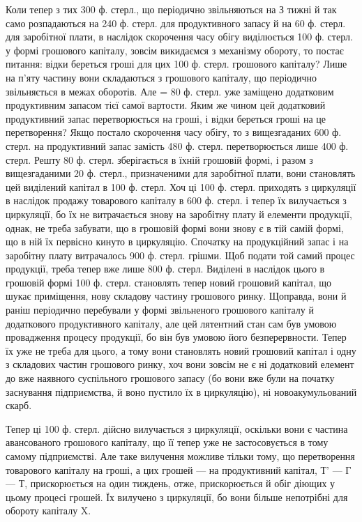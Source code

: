 Коли тепер з тих 300 ф. стерл., що періодично звільняються на З
тижні й так само розпадаються на 240 ф. стерл. для продуктивного запасу
й на 60 ф. стерл. для заробітної плати, в наслідок скорочення часу
обігу виділюється 100 ф. стерл. у формі грошового капіталу, зовсім викидаємся
з механізму обороту, то постає питання: відки береться гроші
для цих 100 ф. стерл. грошового капіталу? Лише на п’яту частину вони
складаються з грошового капіталу, що періодично звільняється в межах
оборотів. Але  = 80 ф. стерл. уже заміщено додатковим продуктивним
запасом тієї самої вартости. Яким же чином цей додатковий продуктивний
запас перетворюється на гроші, і відки береться гроші на це перетворення?
Якщо постало скорочення часу обігу, то з вищезгаданих 600 ф. стерл.
на продуктивний запас замість 480 ф. стерл. перетворюється лише 400 ф.
стерл. Решту 80 ф. стерл. зберігається в їхній грошовій формі, і
разом з вищезгаданими 20 ф. стерл., призначеними для заробітної плати,
вони становлять цей виділений капітал в 100 ф. стерл. Хоч ці 100 ф.
стерл. приходять з циркуляції в наслідок продажу товарового капіталу в
600 ф. стерл. і тепер їх вилучається з циркуляції, бо їх не витрачається
знову на заробітну плату й елементи продукції, однак, не треба забувати,
що в грошовій формі вони знову є в тій самій формі, що в ній їх
первісно кинуто в циркуляцію. Спочатку на продукційний запас і на заробітну
плату витрачалось 900 ф. стерл. грішми. Щоб подати той
самий процес продукції, треба тепер вже лише 800 ф. стерл. Виділені в
наслідок цього в грошовій формі 100 ф. стерл. становлять тепер новий
грошовий капітал, що шукає приміщення, нову складову частину грошового
ринку. Щоправда, вони й раніш періодично перебували у формі
звільненого грошового капіталу й додаткового продуктивного капіталу,
але цей лятентний стан сам був умовою провадження процесу продукції,
бо він був умовою його безперервности. Тепер їх уже не треба для
цього, а тому вони становлять новий грошовий капітал і одну з складових
частин грошового ринку, хоч вони зовсім не є ні додатковий елемент
до вже наявного суспільного грошового запасу (бо вони вже були
на початку заснування підприємства, й воно пустило їх в циркуляцію),
ні новоакумульований скарб.

Тепер ці 100 ф. стерл. дійсно вилучається з циркуляції, оскільки вони
є частина авансованого грошового капіталу, що її тепер уже не застосовується
в тому самому підприємстві. Але таке вилучення можливе
тільки тому, що перетворення товарового капіталу на гроші, а цих грошей
— на продуктивний капітал, Т' — Г — Т, прискорюється на один тиждень,
отже, прискорюється й обіг діющих у цьому процесі грошей. Їх вилучено
з циркуляції, бо вони більше непотрібні для обороту капіталу X.

